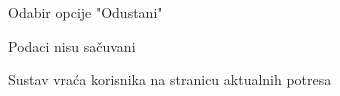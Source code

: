 \begin{packed_item}
\begin{packed_item}
\begin{packed_enum}
					\end{packed_enum}
					
					\item[7.a] Odabir opcije "Odustani"
					\item[] \begin{packed_enum}
						
						\item Podaci nisu sačuvani
						\item Sustav vraća korisnika na stranicu aktualnih potresa
						
					\end{packed_enum}
					
				\end{packed_item}
				
			\end{packed_item}	
			

